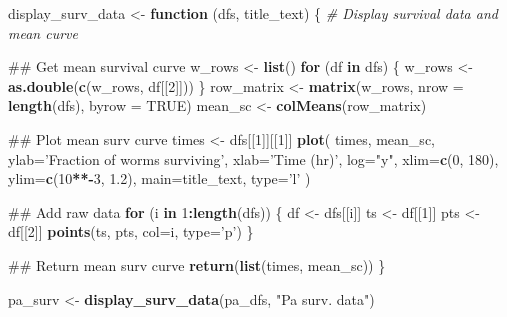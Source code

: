 \documentclass[]{article}
\newenvironment{Shaded}{\begin{snugshade}}{\end{snugshade}}
\newcommand{\KeywordTok}[1]{\textcolor[rgb]{0.13,0.29,0.53}{\textbf{#1}}}
\newcommand{\DataTypeTok}[1]{\textcolor[rgb]{0.13,0.29,0.53}{#1}}
\newcommand{\DecValTok}[1]{\textcolor[rgb]{0.00,0.00,0.81}{#1}}
\newcommand{\FloatTok}[1]{\textcolor[rgb]{0.00,0.00,0.81}{#1}}
\newcommand{\StringTok}[1]{\textcolor[rgb]{0.31,0.60,0.02}{#1}}
\newcommand{\CommentTok}[1]{\textcolor[rgb]{0.56,0.35,0.01}{\textit{#1}}}
\newcommand{\OtherTok}[1]{\textcolor[rgb]{0.56,0.35,0.01}{#1}}
\newcommand{\ControlFlowTok}[1]{\textcolor[rgb]{0.13,0.29,0.53}{\textbf{#1}}}
\newcommand{\OperatorTok}[1]{\textcolor[rgb]{0.81,0.36,0.00}{\textbf{#1}}}
\newcommand{\NormalTok}[1]{#1}
\begin{document}
\begin{Shaded}
\begin{Highlighting}[]
\NormalTok{display_surv_data <-}\StringTok{ }\ControlFlowTok{function}\NormalTok{ (dfs, title_text) \{}
  \CommentTok{# Display survival data and mean curve }
  
\NormalTok{  ## Get mean survival curve}
\NormalTok{  w_rows <-}\StringTok{ }\KeywordTok{list}\NormalTok{()}
  \ControlFlowTok{for}\NormalTok{ (df }\ControlFlowTok{in}\NormalTok{ dfs) \{}
\NormalTok{    w_rows <-}\StringTok{ }\KeywordTok{as.double}\NormalTok{(}\KeywordTok{c}\NormalTok{(w_rows, df[[}\DecValTok{2}\NormalTok{]]))}
\NormalTok{  \}}
\NormalTok{  row_matrix <-}\StringTok{ }\KeywordTok{matrix}\NormalTok{(w_rows, }\DataTypeTok{nrow =} \KeywordTok{length}\NormalTok{(dfs), }\DataTypeTok{byrow =} \OtherTok{TRUE}\NormalTok{)}
\NormalTok{  mean_sc <-}\StringTok{ }\KeywordTok{colMeans}\NormalTok{(row_matrix)}

\NormalTok{  ## Plot mean surv curve}
\NormalTok{  times <-}\StringTok{ }\NormalTok{dfs[[}\DecValTok{1}\NormalTok{]][[}\DecValTok{1}\NormalTok{]]}
  \KeywordTok{plot}\NormalTok{(}
\NormalTok{      times, mean_sc,}
      \DataTypeTok{ylab=}\StringTok{'Fraction of worms surviving'}\NormalTok{, }
      \DataTypeTok{xlab=}\StringTok{'Time (hr)'}\NormalTok{, }
      \DataTypeTok{log=}\StringTok{"y"}\NormalTok{, }
      \DataTypeTok{xlim=}\KeywordTok{c}\NormalTok{(}\DecValTok{0}\NormalTok{, }\DecValTok{180}\NormalTok{), }
      \DataTypeTok{ylim=}\KeywordTok{c}\NormalTok{(}\DecValTok{10}\OperatorTok{**-}\DecValTok{3}\NormalTok{, }\FloatTok{1.2}\NormalTok{),}
      \DataTypeTok{main=}\NormalTok{title_text,}
      \DataTypeTok{type=}\StringTok{'l'}
\NormalTok{    )}
  
\NormalTok{  ## Add raw data}
  \ControlFlowTok{for}\NormalTok{ (i }\ControlFlowTok{in} \DecValTok{1}\OperatorTok{:}\KeywordTok{length}\NormalTok{(dfs)) \{}
\NormalTok{    df <-}\StringTok{ }\NormalTok{dfs[[i]]}
\NormalTok{    ts <-}\StringTok{ }\NormalTok{df[[}\DecValTok{1}\NormalTok{]]}
\NormalTok{    pts <-}\StringTok{ }\NormalTok{df[[}\DecValTok{2}\NormalTok{]]}
    \KeywordTok{points}\NormalTok{(ts, pts, }\DataTypeTok{col=}\NormalTok{i, }\DataTypeTok{type=}\StringTok{'p'}\NormalTok{)}
\NormalTok{  \}}
  
\NormalTok{   ## Return mean surv curve}
  \KeywordTok{return}\NormalTok{(}\KeywordTok{list}\NormalTok{(times, mean_sc))}
\NormalTok{\}}

\NormalTok{pa_surv <-}\StringTok{ }\KeywordTok{display_surv_data}\NormalTok{(pa_dfs, }\StringTok{"Pa surv. data"}\NormalTok{)}
\end{Highlighting}
\end{Shaded}
\end{document}
